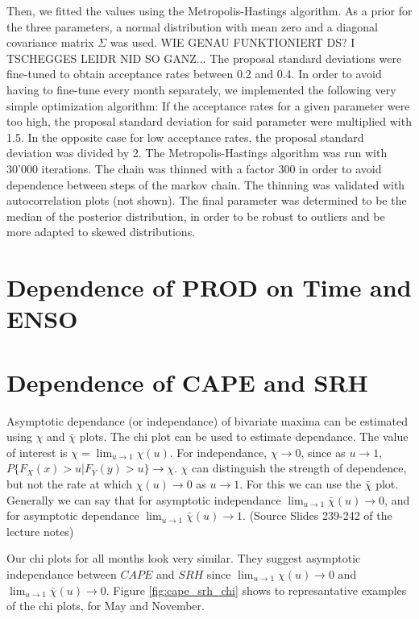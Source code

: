 \documentclass[10pt,conference,compsocconf]{IEEEtran}
\begin{document}
\par
Then, we fitted the values using the Metropolis-Hastings algorithm. As a prior for the three parameters, a normal distribution with mean zero and a diagonal covariance matrix $\Sigma$ was used. 
WIE GENAU FUNKTIONIERT DS? I TSCHEGGES LEIDR NID SO GANZ...
The proposal standard deviations were fine-tuned to obtain acceptance rates between 0.2 and 0.4. In order to avoid having to fine-tune every month separately, we implemented the following very simple optimization algorithm: If the acceptance rates for a given parameter were too high, the proposal standard deviation for said parameter were multiplied with 1.5. In the opposite case for low acceptance rates, the proposal standard deviation was divided by 2. The Metropolis-Hastings algorithm was run with 30'000 iterations. The chain was thinned with a factor 300 in order to avoid dependence between steps of the markov chain. The thinning was validated with autocorrelation plots (not shown). The final parameter was determined to be the median of the posterior distribution, in order to be robust to outliers and be more adapted to skewed distributions. 
\par


\section*{Dependence of PROD on Time and ENSO}


\section*{Dependence of CAPE and SRH}
Asymptotic dependance (or independance) of bivariate maxima can be estimated using $\chi$ and $\bar{\chi}$ plots. The chi plot can be used to estimate dependance. The value of interest is $\chi = \lim_{u \to 1} \chi(u)$. For independance, $\chi \to 0$, since as $u \to 1$, $P\{F_X(x)>u | F_Y(y)>u\} \to \chi$. $\chi$ can distinguish the strength of dependence, but not the rate at which $\chi(u) \to 0$ as $u \to 1$. For this we can use the $\bar{\chi}$ plot. Generally we can say that for asymptotic independance $\lim_{u \to 1} \bar{\chi}(u) \to 0$, and for asymptotic dependance $\lim_{u \to 1} \bar{\chi}(u) \to 1$. (Source Slides 239-242 of the lecture notes)
\par
Our chi plots for all months look very similar. They suggest asymptotic independance between $CAPE$ and $SRH$ since $\lim_{u \to 1} \chi(u) \to 0$ and $\lim_{u \to 1} \bar{\chi}(u) \to 0$. Figure \ref{fig:cape_srh_chi} shows to represantative examples of the chi plots, for May and November. 
\end{document}
